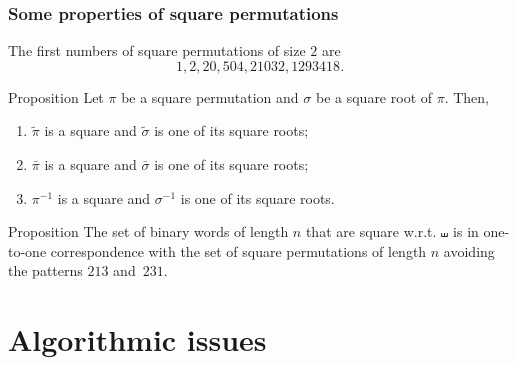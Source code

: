 \documentclass[unknownkeysallowed,10pt,xcolor={dvipsnames}]{beamer}
\begin{document}
\begin{frame} \frametitle{Some properties of square permutations}
The first numbers of square permutations of size $2$ are
\begin{equation*}
    1, 2, 20, 504, 21032, 1293418.
\end{equation*}

\begin{block}{Proposition}
    Let $\pi$ be a square permutation and $\sigma$ be a square root of
    $\pi$. Then,
    \begin{enumerate}
        \item $\widetilde{\pi}$ is a square and
        $\widetilde{\sigma}$ is one of its square roots;
        \smallskip

        \item $\bar \pi$ is a square and $\bar \sigma$ is one of
        its square roots;
        \smallskip

        \item $\pi^{-1}$ is a square and $\sigma^{-1}$ is one of
        its square roots.
    \end{enumerate}
\end{block}
\medskip

\begin{block}{Proposition}
    The set of binary words of length $n$ that are square w.r.t.
    $\shuffle$ is in one-to-one correspondence with the set of
    square permutations of length $n$ avoiding the patterns
    $213$ and~$231$.
\end{block}
\end{frame}

\section{Algorithmic issues}

\end{document}
